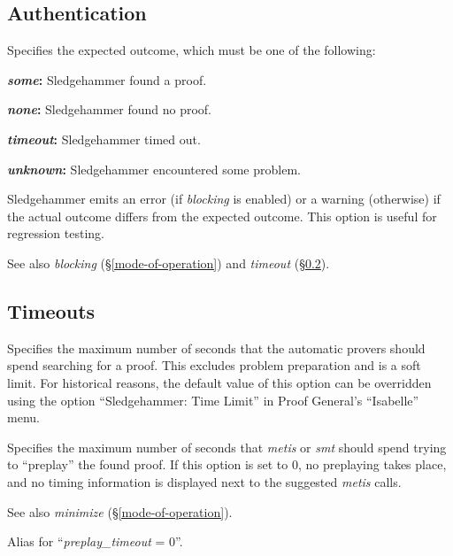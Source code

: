 \documentclass[a4paper,12pt]{article}
\begin{document}
\subsection{Authentication}
\label{authentication}

\begin{enum}
Specifies the expected outcome, which must be one of the following:

\begin{enum}
\item[\labelitemi] \textbf{\textit{some}:} Sledgehammer found a proof.
\item[\labelitemi] \textbf{\textit{none}:} Sledgehammer found no proof.
\item[\labelitemi] \textbf{\textit{timeout}:} Sledgehammer timed out.
\item[\labelitemi] \textbf{\textit{unknown}:} Sledgehammer encountered some
problem.
\end{enum}

Sledgehammer emits an error (if \textit{blocking} is enabled) or a warning
(otherwise) if the actual outcome differs from the expected outcome. This option
is useful for regression testing.

\nopagebreak
{\small See also \textit{blocking} (\S\ref{mode-of-operation}) and
\textit{timeout} (\S\ref{timeouts}).}
\end{enum}

\subsection{Timeouts}
\label{timeouts}

\begin{enum}
Specifies the maximum number of seconds that the automatic provers should spend
searching for a proof. This excludes problem preparation and is a soft limit.
For historical reasons, the default value of this option can be overridden using
the option ``Sledgehammer: Time Limit'' in Proof General's ``Isabelle'' menu.

Specifies the maximum number of seconds that \textit{metis} or \textit{smt}
should spend trying to ``preplay'' the found proof. If this option is set to 0,
no preplaying takes place, and no timing information is displayed next to the
suggested \textit{metis} calls.

\nopagebreak
{\small See also \textit{minimize} (\S\ref{mode-of-operation}).}

Alias for ``\textit{preplay\_timeout} = 0''.

\end{enum}

\let\em=\sl
{}

\end{document}

